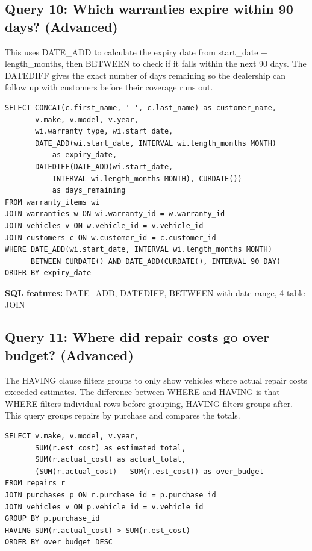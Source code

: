 \documentclass[12pt]{article}
\begin{document}
\subsection{Query 10: Which warranties expire within 90 days? (Advanced)}

This uses DATE\_ADD to calculate the expiry date from start\_date + length\_months, then BETWEEN to check if it falls within the next 90 days. The DATEDIFF gives the exact number of days remaining so the dealership can follow up with customers before their coverage runs out.

\begin{lstlisting}[style=sql]
SELECT CONCAT(c.first_name, ' ', c.last_name) as customer_name,
       v.make, v.model, v.year,
       wi.warranty_type, wi.start_date,
       DATE_ADD(wi.start_date, INTERVAL wi.length_months MONTH)
           as expiry_date,
       DATEDIFF(DATE_ADD(wi.start_date,
           INTERVAL wi.length_months MONTH), CURDATE())
           as days_remaining
FROM warranty_items wi
JOIN warranties w ON wi.warranty_id = w.warranty_id
JOIN vehicles v ON w.vehicle_id = v.vehicle_id
JOIN customers c ON w.customer_id = c.customer_id
WHERE DATE_ADD(wi.start_date, INTERVAL wi.length_months MONTH)
      BETWEEN CURDATE() AND DATE_ADD(CURDATE(), INTERVAL 90 DAY)
ORDER BY expiry_date
\end{lstlisting}

\textbf{SQL features:} DATE\_ADD, DATEDIFF, BETWEEN with date range, 4-table JOIN

\subsection{Query 11: Where did repair costs go over budget? (Advanced)}

The HAVING clause filters groups to only show vehicles where actual repair costs exceeded estimates. The difference between WHERE and HAVING is that WHERE filters individual rows before grouping, HAVING filters groups after. This query groups repairs by purchase and compares the totals.

\begin{lstlisting}[style=sql]
SELECT v.make, v.model, v.year,
       SUM(r.est_cost) as estimated_total,
       SUM(r.actual_cost) as actual_total,
       (SUM(r.actual_cost) - SUM(r.est_cost)) as over_budget
FROM repairs r
JOIN purchases p ON r.purchase_id = p.purchase_id
JOIN vehicles v ON p.vehicle_id = v.vehicle_id
GROUP BY p.purchase_id
HAVING SUM(r.actual_cost) > SUM(r.est_cost)
ORDER BY over_budget DESC
\end{lstlisting}
\end{document}
